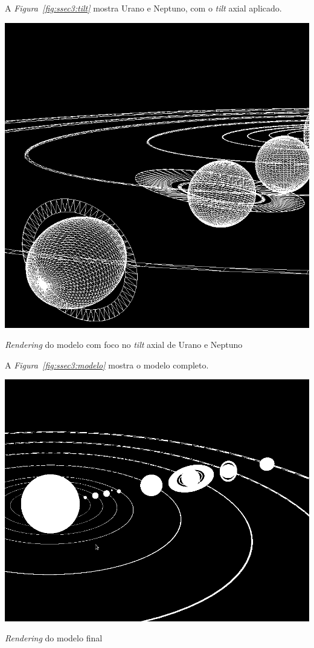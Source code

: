 A \emph{Figura~\ref{fig:ssec3:tilt}} mostra Urano e Neptuno, com o \emph{tilt}
axial aplicado. 

\begin{center}
 	
 	\includegraphics[width=\textwidth,height=\textheight,keepaspectratio]{resources/pormenorTiltAxial.png}
 	\captionsetup{type=figure, width=0.8\linewidth}
	\caption{\textit{Rendering} do modelo com foco no \textit{tilt} axial de Urano e Neptuno}
\label{fig:ssec3:tilt} 
\end{center}


A \emph{Figura~\ref{fig:ssec3:modelo}} mostra o modelo completo. 

\begin{center}
 	
 	\includegraphics[width=\textwidth,height=\textheight,keepaspectratio]{resources/modelo.png}
 	\captionsetup{type=figure, width=0.8\linewidth}
	\caption{\textit{Rendering} do modelo final}
\label{fig:ssec3:modelo} 
\end{center}
